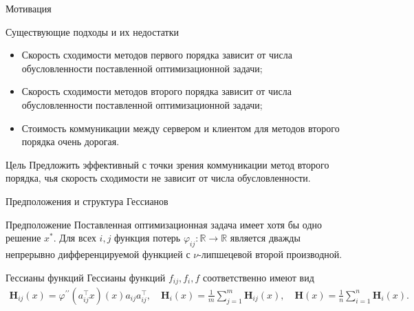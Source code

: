 \documentclass[aspectratio=169,xcolor=dvipsnames]{beamer}
\newcommand{\R}{\mathbb{R}}
\newcommand{\mH}{\mathbf{H}}
\begin{document}
\begin{frame}{Мотивация}
    \begin{block}{Существующие подходы и их недостатки}
        \begin{itemize}
            \item Скорость сходимости методов первого порядка зависит от числа обусловленности поставленной оптимизационной задачи;
            \item Скорость сходимости методов второго порядка зависит от числа обусловленности поставленной оптимизационной задачи;
            \item Стоимость коммуникации между сервером и клиентом для методов второго порядка очень дорогая.
        \end{itemize}
    \end{block}
    \begin{alertblock}{Цель}
        Предложить эффективный с точки зрения коммуникации метод второго порядка, чья скорость сходимости не зависит от числа обусловленности.
    \end{alertblock}
\end{frame}

\begin{frame}{Предположения и структура Гессианов}
    \begin{block}{Предположение}
        Поставленная оптимизационная задача имеет хотя бы одно решение $x^*$. Для всех $i, j$ функция потерь $\varphi_{ij}:\R\to \R$ является дважды непрерывно дифференцируемой функцией с $\nu$-липшецевой второй производной. 
    \end{block}
    \begin{block}{Гессианы функций}
        Гессианы функций $f_{ij}, f_i, f$ соответственно имеют вид
        \begin{eqnarray}
            \mH_{ij}(x) =  \varphi^{\prime\prime}(a_{ij}^\top x)(x)a_{ij}a_{ij}^\top, \quad \mH_i(x)= \frac{1}{m}\sum\limits_{j=1}^m \mH_{ij}(x), \quad \mH(x) = \frac{1}{n}\sum\limits_{i=1}^n \mH_{i}(x).
        \end{eqnarray}
    \end{block}
\end{frame}
\end{document}
